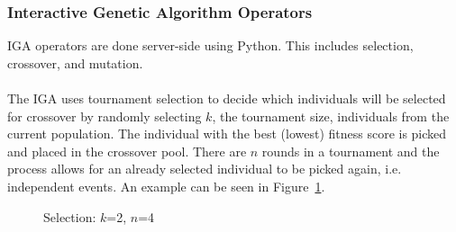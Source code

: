 \documentclass[12pt]{article} %
\begin{document}
\subsubsection{Interactive Genetic Algorithm Operators}
IGA operators are done server-side using Python. This includes selection, crossover, and mutation.\\
\\
The IGA uses tournament selection to decide which individuals will be selected for crossover by randomly selecting $k$, the tournament size, individuals from the current population. The individual with the best (lowest) fitness score is picked and placed in the crossover pool. There are $n$ rounds in a tournament and the process allows for an already selected individual to be picked again, i.e. independent events. An example can be seen in Figure~\ref{fig:selection_ex}.

\begin{figure}[H]
\caption{Selection: $k$=2, $n$=4}
\label{fig:selection_ex}
\end{figure}
\end{document}
